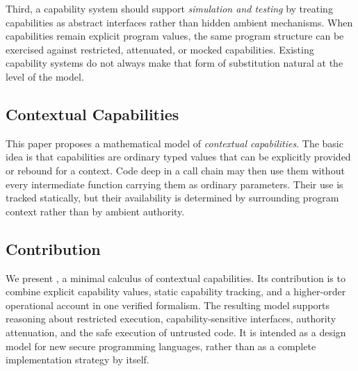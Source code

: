 Third, a capability system should support \emph{simulation and testing} by
treating capabilities as abstract interfaces rather than hidden ambient
mechanisms. %
When capabilities remain explicit program values, the same program structure can
be exercised against restricted, attenuated, or mocked capabilities. %
Existing capability systems do not always make that form of substitution natural
at the level of the model. %

\subsection{Contextual Capabilities}

This paper proposes a mathematical model of \emph{contextual capabilities}. %
The basic idea is that capabilities are ordinary typed values that can be
explicitly provided or rebound for a context. %
Code deep in a call chain may then use them without every intermediate function
carrying them as ordinary parameters. %
Their use is tracked statically, but their availability is determined by
surrounding program context rather than by ambient authority. %

\subsection{Contribution}

We present \lambdaCC{}, a minimal calculus of contextual capabilities. %
Its contribution is to combine explicit capability values, static capability
tracking, and a higher-order operational account in one verified formalism. %
The resulting model supports reasoning about restricted execution,
capability-sensitive interfaces, authority attenuation, and the safe execution
of untrusted code. %
It is intended as a design model for new secure programming languages, rather
than as a complete implementation strategy by itself. %

